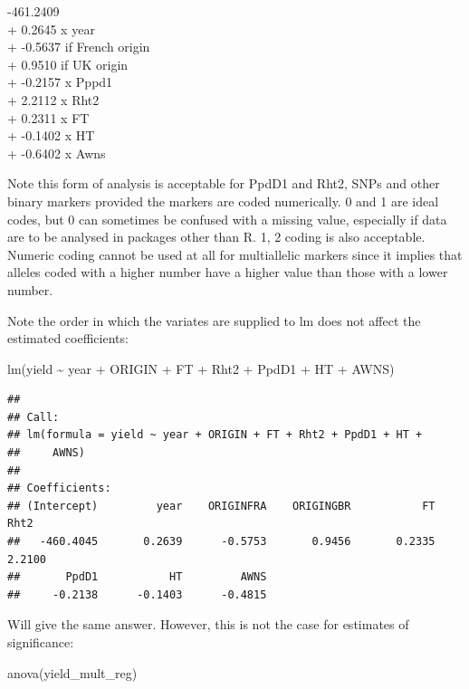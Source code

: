 \documentclass[
]{book}
\newenvironment{Shaded}{\begin{snugshade}}{\end{snugshade}}
\newcommand{\FunctionTok}[1]{\textcolor[rgb]{0.00,0.00,0.00}{#1}}
\newcommand{\NormalTok}[1]{#1}
\newcommand{\SpecialCharTok}[1]{\textcolor[rgb]{0.00,0.00,0.00}{#1}}
\begin{document}
-461.2409\\
+ 0.2645 x year\\
+ -0.5637 if French origin\\
+ 0.9510 if UK origin\\
+ -0.2157 x Pppd1\\
+ 2.2112 x Rht2\\
+ 0.2311 x FT\\
+ -0.1402 x HT\\
+ -0.6402 x Awns

Note this form of analysis is acceptable for PpdD1 and Rht2, SNPs and other binary markers provided the markers are coded numerically. 0 and 1 are ideal codes, but 0 can sometimes be confused with a missing value, especially if data are to be analysed in packages other than R. 1, 2 coding is also acceptable. Numeric coding cannot be used at all for multiallelic markers since it implies that alleles coded with a higher number have a higher value than those with a lower number.

Note the order in which the variates are supplied to lm does not affect the estimated coefficients:

\begin{Shaded}
\begin{Highlighting}[]
\FunctionTok{lm}\NormalTok{(yield }\SpecialCharTok{\textasciitilde{}}\NormalTok{ year }\SpecialCharTok{+}\NormalTok{ ORIGIN }\SpecialCharTok{+}\NormalTok{ FT }\SpecialCharTok{+}\NormalTok{ Rht2 }\SpecialCharTok{+}\NormalTok{ PpdD1 }\SpecialCharTok{+}\NormalTok{ HT }\SpecialCharTok{+}\NormalTok{ AWNS)}
\end{Highlighting}
\end{Shaded}

\begin{verbatim}
## 
## Call:
## lm(formula = yield ~ year + ORIGIN + FT + Rht2 + PpdD1 + HT + 
##     AWNS)
## 
## Coefficients:
## (Intercept)         year    ORIGINFRA    ORIGINGBR           FT         Rht2  
##   -460.4045       0.2639      -0.5753       0.9456       0.2335       2.2100  
##       PpdD1           HT         AWNS  
##     -0.2138      -0.1403      -0.4815
\end{verbatim}

Will give the same answer. However, this is not the case for estimates of significance:

\begin{Shaded}
\begin{Highlighting}[]
\FunctionTok{anova}\NormalTok{(yield\_mult\_reg)}
\end{Highlighting}
\end{Shaded}
\end{document}
